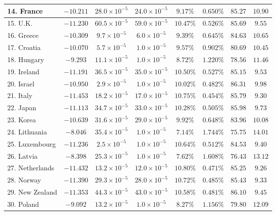 \documentclass[12pt, titlepage]{article}%
\begin{document}
\begin{table}
\begin{center}
\begin{tabular}{||l|c|c|c|c|c|c|c||}
14. France &  $-10.211$ & $28.0\times10^{-5}$ & $24.0\times10^{-5}$ & $9.17\%$ & $0.650\%$ & $85.27$ & $10.90$\\ \hline
15. U.K. &  $-11.230$ & $60.5\times10^{-5}$ & $59.0\times10^{-5}$ & $10.47\%$ & $0.526\%$ & $85.69$ & $9.55$\\ \hline
16. Greece &  $-10.309$ & $9.7\times10^{-5}$ & $6.0\times10^{-5}$ & $9.39\%$ & $0.645\%$ & $84.63$ & $10.65$\\ \hline
17. Croatia &  $-10.070$ & $5.7\times10^{-5}$ & $1.0\times10^{-5}$ & $9.57\%$ & $0.902\%$ & $80.69$ & $10.45$\\ \hline
18. Hungary &  $-9.293$ & $11.1\times10^{-5}$ & $1.0\times10^{-5}$ & $8.72\%$ & $1.220\%$ & $78.56$ & $11.46$\\ \hline
19. Ireland &  $-11.191$ & $36.5\times10^{-5}$ & $35.0\times10^{-5}$ & $10.50\%$ & $0.527\%$ & $85.15$ & $9.53$\\ \hline
20. Israel &  $-10.950$ & $2.9\times10^{-5}$ & $1.0\times10^{-5}$ & $10.02\%$ & $0.482\%$ & $86.31$ & $9.98$\\ \hline
21. Italy &  $-11.453$ & $18.2\times10^{-5}$ & $17.0\times10^{-5}$ & $10.75\%$ & $0.454\%$ & $85.79$ & $9.30$\\ \hline
22. Japan &  $-11.113$ & $34.7\times10^{-5}$ & $33.0\times10^{-5}$ & $10.28\%$ & $0.505\%$ & $85.98$ & $9.73$\\ \hline
23. Korea &  $-10.639$ & $31.6\times10^{-5}$ & $29.0\times10^{-5}$ & $9.92\%$ & $0.648\%$ & $83.96$ & $10.08$\\ \hline
24. Lithuania &  $-8.046$ & $35.4\times10^{-5}$ & $1.0\times10^{-5}$ & $7.14\%$ & $1.744\%$ & $75.75$ & $14.01$\\ \hline
25. Luxembourg &  $-11.236$ & $2.5\times10^{-5}$ & $1.0\times10^{-5}$ & $10.64\%$ & $0.512\%$ & $84.53$ & $9.40$\\ \hline
26. Latvia &  $-8.398$ & $25.3\times10^{-5}$ & $1.0\times10^{-5}$ & $7.62\%$ & $1.608\%$ & $76.43$ & $13.12$\\ \hline
27. Netherlands &  $-11.432$ & $13.2\times10^{-5}$ & $12.0\times10^{-5}$ & $10.80\%$ & $0.471\%$ & $85.25$ & $9.26$\\ \hline
28. Norway &  $-11.390$ & $29.3\times10^{-5}$ & $28.0\times10^{-5}$ & $10.72\%$ & $0.485\%$ & $85.43$ & $9.33$\\ \hline
29. New Zealand &  $-11.353$ & $44.3\times10^{-5}$ & $43.0\times10^{-5}$ & $10.58\%$ & $0.481\%$ & $86.10$ & $9.45$\\ \hline
30. Poland &  $-9.092$ & $13.2\times10^{-5}$ & $1.0\times10^{-5}$ & $8.27\%$ & $1.156\%$ & $79.80$ & $12.09$\\ \hline

\end{tabular}
\end{center}
\end{table}
\end{document}
